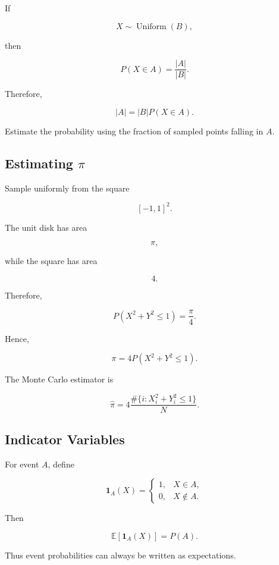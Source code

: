 If

\[
X\sim\operatorname{Uniform}(B),
\]

then

\[
\boxed{
P(X\in A)
=
\frac{
|A|
}{
|B|
}.
}
\]

Therefore,

\[
\boxed{
|A|
=
|B|
P(X\in A).
}
\]

Estimate the probability using the fraction of sampled points falling in
\(A\).

\subsection{Estimating \(\pi\)}
\label{subsec:mc-estimating-pi}

Sample uniformly from the square

\[
[-1,1]^2.
\]

The unit disk has area

\[
\pi,
\]

while the square has area

\[
4.
\]

Therefore,

\[
P(X^2+Y^2\leq1)
=
\frac{\pi}{4}.
\]

Hence,

\[
\boxed{
\pi
=
4
P(X^2+Y^2\leq1).
}
\]

The Monte Carlo estimator is

\[
\boxed{
\widehat{\pi}
=
4
\frac{
\#\{
i:
X_i^2+Y_i^2\leq1
\}
}{
N
}.
}
\]

\subsection{Indicator Variables}
\label{subsec:mc-indicator-variables}

For event \(A\), define

\[
\boxed{
\mathbf{1}_A(X)
=
\begin{cases}
1,
&
X\in A,
\\
0,
&
X\notin A.
\end{cases}
}
\]

Then

\[
\boxed{
\mathbb{E}
[
\mathbf{1}_A(X)
]
=
P(A).
}
\]

Thus event probabilities can always be written as expectations.


